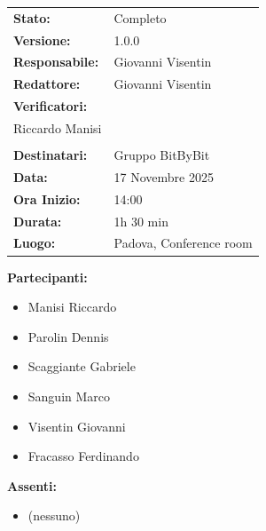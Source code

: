\documentclass[a4paper,12pt]{article}
\begin{document}
\begin{tcolorbox}
\begin{tabularx}{\textwidth}{@{}l X@{}}
\textbf{Stato:} & Completo\\
\textbf{Versione:} & 1.0.0\\
\textbf{Responsabile:} & Giovanni Visentin\\
\textbf{Redattore:} & Giovanni Visentin \\
\textbf{Verificatori:} & 
    \begin{tabular}[t]{@{}l@{}}
            Dennis Parolin \\
            Riccardo Manisi\\
    \end{tabular}\\
\textbf{Destinatari:} & Gruppo BitByBit\\
\textbf{Data:} & 17 Novembre 2025 \\
\textbf{Ora Inizio:} & 14:00 \\
\textbf{Durata:} & 1h 30 min \\
\textbf{Luogo:} & Padova, Conference room \\
\end{tabularx}
\end{tcolorbox}

\vspace{0.4cm}
\textbf{Partecipanti:}
\begin{itemize}
    \item Manisi Riccardo
    \item Parolin Dennis
    \item Scaggiante Gabriele
    \item Sanguin Marco
    \item Visentin Giovanni
    \item Fracasso Ferdinando
\end{itemize}

\textbf{Assenti:}
\begin{itemize}
    \item (nessuno)
\end{itemize}

\clearpage

\vspace{0.5cm}

\vspace{0.8cm}

\clearpage
\tableofcontents
\thispagestyle{empty} %
\clearpage
\end{document}
